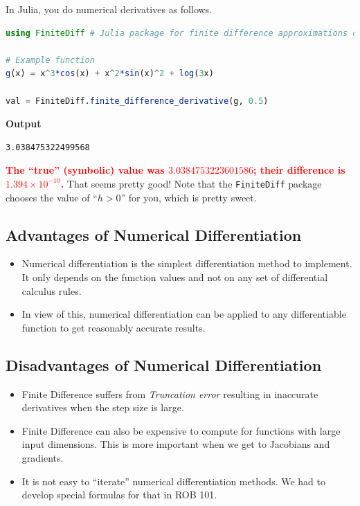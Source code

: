 \bigskip

In Julia, you do numerical derivatives as follows. \\


\begin{lstlisting}[language=Julia,style=mystyle]
using FiniteDiff # Julia package for finite difference approximations of derivatives.

# Example function
g(x) = x^3*cos(x) + x^2*sin(x)^2 + log(3x)

val = FiniteDiff.finite_difference_derivative(g, 0.5)
\end{lstlisting}
\textbf{Output} 
\begin{verbatim}
3.038475322499568
\end{verbatim}

\textcolor{red}{\bf The ``true'' (symbolic) value was $3.0384753223601586$; their difference is $1.394 \times 10^{-10}$.} That seems pretty good! Note that the \texttt{FiniteDiff} package chooses the value of ``$h>0$'' for you, which is pretty sweet. 

\vspace*{.2cm}

\subsection*{Advantages of Numerical Differentiation}
\begin{itemize}
    \item Numerical differentiation is the simplest differentiation method to implement. It only depends on the function values and not on any set of differential calculus rules.
    \item In view of this, numerical differentiation can be applied to any differentiable function to get reasonably accurate results.
\end{itemize}

\subsection*{Disadvantages of Numerical Differentiation}
\begin{itemize}
    \item Finite Difference suffers from \textit{Truncation error} resulting in inaccurate derivatives when the step size is large.
    \item Finite Difference can also be expensive to compute for functions with large input dimensions. This is more important when we get to Jacobians and gradients.
    \item It is not easy to ``iterate'' numerical differentiation methods. We had to develop special formulas for that in ROB 101.
\end{itemize}




